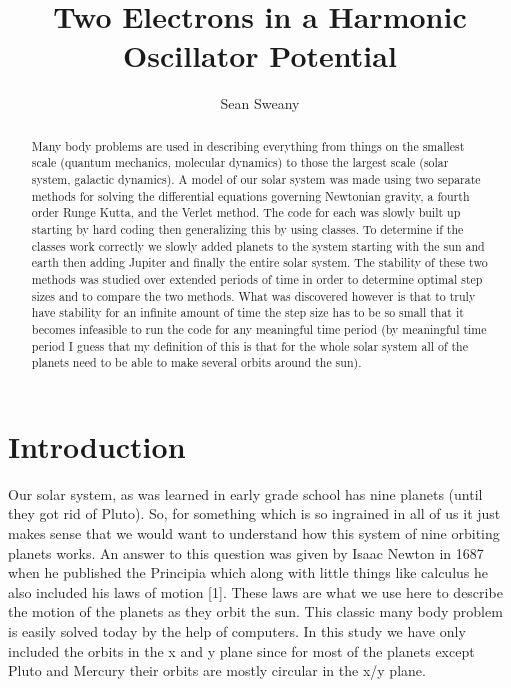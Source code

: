 \documentclass[12pt,righttag]{article}
\begin{document}
	\title{Two Electrons in a Harmonic Oscillator Potential}
	\author{Sean Sweany}
	\renewcommand{\today}{April 3, 2016}
	\maketitle
	
	\begin{abstract}
Many body problems are used in describing everything from things on the smallest scale (quantum mechanics, molecular dynamics) to those the largest scale (solar system, galactic dynamics). A model of our solar system was made using two separate methods for solving the differential equations governing Newtonian gravity, a fourth order Runge Kutta, and the Verlet method. The code for each was slowly built up starting by hard coding then generalizing this by using classes. To determine if the classes work correctly we slowly added planets to the system starting with the sun and earth then adding Jupiter and finally the entire solar system. The stability of these two methods was studied over extended periods of time in order to determine optimal step sizes and to compare the two methods. What was discovered however is that to truly have stability for an infinite amount of time the step size has to be so small that it becomes infeasible to run the code for any meaningful time period (by meaningful time period I guess that my definition of this is that for the whole solar system all of the planets need to be able to make several orbits around the sun).
	\end{abstract}

	
	\section{Introduction}
    Our solar system, as was learned in early grade school has nine planets (until they got rid of Pluto). So, for something which is so ingrained in all of us it just makes sense that we would want to understand how this system of nine orbiting planets works. An answer to this question was given by Isaac Newton in 1687 when he published the Principia which along with little things like calculus he also included his laws of motion [1]. These laws are what we use here to describe the motion of the planets as they orbit the sun. This classic many body problem is easily solved today by the help of computers. In this study we have only included the orbits in the x and y plane since for most of the planets except Pluto and Mercury their orbits are mostly circular in the x/y plane.
\end{document}
